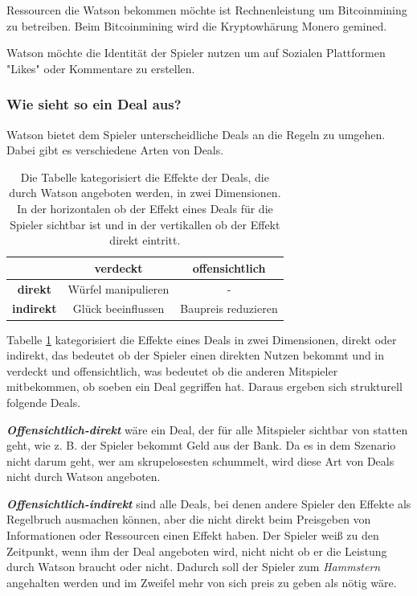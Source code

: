 \documentclass[german]{cgspaper} %
\newcommand{\neuerBegriff}[1]{\textbf{\textit{#1}}}
\begin{document}
Ressourcen die Watson bekommen möchte ist Rechnenleistung um Bitcoinmining zu betreiben.
Beim Bitcoinmining wird die Kryptowhärung Monero gemined.

Watson möchte die Identität der Spieler nutzen um auf Sozialen Plattformen "Likes" oder Kommentare zu erstellen.

\subsubsection{Wie sieht so ein Deal aus?}

Watson bietet dem Spieler unterscheidliche Deals an die Regeln zu umgehen.
Dabei gibt es verschiedene Arten von Deals.

\begin{table}[h]
\centering
\begin{tabular}{|c|c|c|}
\hline 
& \textbf{verdeckt} & \textbf{offensichtlich} \\
\hline
\textbf{direkt} & Würfel manipulieren & - \\
\hline
\textbf{indirekt} & Glück beeinflussen & Baupreis reduzieren \\
\hline
\end{tabular}
\caption{Die Tabelle kategorisiert die Effekte der Deals, die durch Watson angeboten werden, in zwei Dimensionen. In der horizontalen ob der Effekt eines Deals für die Spieler sichtbar ist und in der vertikallen ob der Effekt direkt eintritt.}
\label{tab:effekte}
\end{table}

Tabelle \ref{tab:effekte} kategorisiert die Effekte eines Deals in zwei Dimensionen, direkt oder indirekt, das bedeutet ob der Spieler einen direkten Nutzen bekommt und in verdeckt und offensichtlich, was bedeutet ob die anderen Mitspieler mitbekommen, ob soeben ein Deal gegriffen hat.
Daraus ergeben sich strukturell folgende Deals.

\neuerBegriff{Offensichtlich-direkt} wäre ein Deal, der für alle Mitspieler sichtbar von statten geht, wie z. B. der Spieler bekommt Geld aus der Bank. 
Da es in dem Szenario nicht darum geht, wer am skrupelosesten schummelt, wird diese Art von Deals nicht durch Watson angeboten.

\neuerBegriff{Offensichtlich-indirekt} sind alle Deals, bei denen andere Spieler den Effekte als Regelbruch ausmachen können, aber die nicht direkt beim Preisgeben von Informationen oder Ressourcen einen Effekt haben.
Der Spieler weiß zu den Zeitpunkt, wenn ihm der Deal angeboten wird, nicht nicht ob er die Leistung durch Watson braucht oder nicht.
Dadurch soll der Spieler zum \textit{Hammstern} angehalten werden und im Zweifel mehr von sich preis zu geben als nötig wäre.
\end{document}
